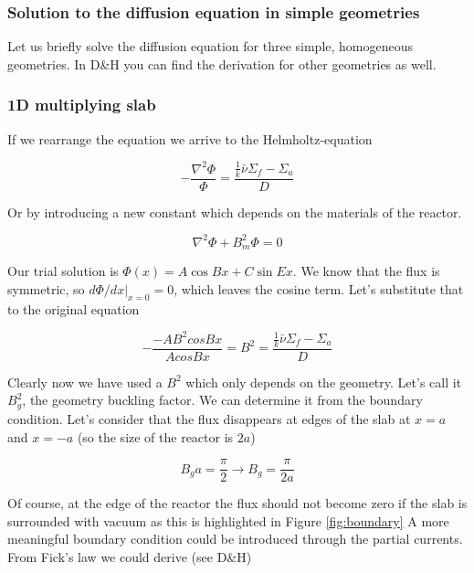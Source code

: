 \subsubsection{Solution to the diffusion equation in simple geometries}

Let us briefly solve the diffusion equation for three simple, homogeneous geometries. In D\&H you can find the derivation for other geometries as well.

\subsubsection*{1D multiplying slab}

If we rearrange the equation we arrive to the Helmholtz-equation

\begin{equation}
-\frac{\nabla^2 \Phi}{\Phi}=\frac{\frac{1}{k}\bar\nu\Sigma_f-\Sigma_a}{D}
\end{equation}

Or by introducing a new constant which depends on the materials of the reactor.

\begin{equation}
\nabla^2 \Phi+B_m^2\Phi=0
\end{equation}

Our trial solution is $\Phi(x)=A\cos Bx+C\sin Ex$. We know that the flux is symmetric, so  $d\Phi/dx|_{x=0}=0$, which leaves the cosine term. Let's substitute that to the original equation

\begin{equation}
-\frac{-AB^2cosBx}{AcosBx}=B^2=\frac{\frac{1}{k}\bar\nu\Sigma_f-\Sigma_a}{D}
\end{equation}

Clearly now we have used a $B^2$ which only depends on the geometry. Let's call it $B_g^2$, the geometry buckling factor. We can determine it from the boundary condition. Let's consider that the flux disappears at edges of the slab at $x=a$ and $x=-a$ (so the size of the reactor is $2a$)

\[
B_ga=\frac{\pi}{2} \rightarrow B_g=\frac{\pi}{2a}
\]

Of course, at the edge of the reactor the flux should not become zero if the slab is surrounded with vacuum as this is highlighted in Figure \ref{fig:boundary} A more meaningful boundary condition could be introduced through the partial currents. From Fick's law we could derive (see D\&H)

